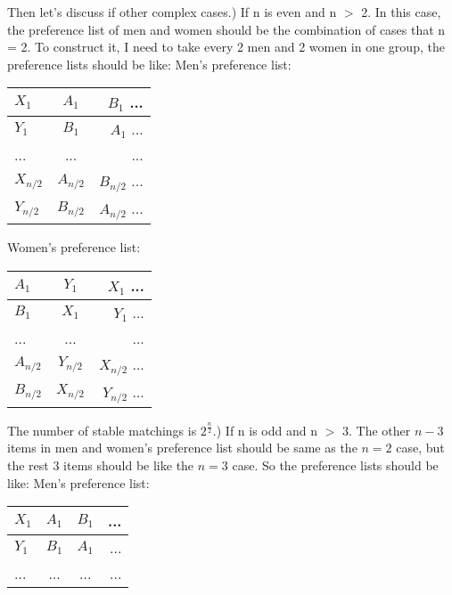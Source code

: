 \documentclass{article}       %
\begin{document}
\begin{enumerate}
\begin{enumerate}
               Then let's discuss if other complex cases.) If n is even and n $>$ 2. In this case, the preference list of men and women should be the combination of cases that n = 2. To construct it, I need to take every 2 men and 2 women in one group, the preference lists should be like:\newline
               Men's preference list:
               \begin{tabular}{ | l | c | r  }
               	\hline
               	$X_1$ & $A_1$ & $B_1$ ... \\ \hline
                $Y_1$ & $B_1$ & $A_1$ ... \\
               	... & ... & ... \\
               	$X_{n/2}$ & $A_{n/2}$ & $B_{n/2}$ ... \\ \hline
               	$Y_{n/2}$ & $B_{n/2}$ & $A_{n/2}$ ... \\ \hline
               \end{tabular}
               Women's preference list:
               \begin{tabular}{ | l | c | r  }
               	\hline
               	$A_1$ & $Y_1$ & $X_1$ ... \\ \hline
               	$B_1$ & $X_1$ & $Y_1$ ... \\
               	... & ... & ... \\
               	$A_{n/2}$ & $Y_{n/2}$ & $X_{n/2}$ ... \\ \hline
               	$B_{n/2}$ & $X_{n/2}$ & $Y_{n/2}$ ... \\ \hline
               \end{tabular}\newline
               The number of stable matchings is $2^{\frac{n}{2}}$.) If n is odd and n $>$ 3. The other $n-3$ items in men and women's preference list should be same as the $n = 2$ case, but the rest 3 items should be like the $n = 3$ case. So the preference lists should be like:\newline
               Men's preference list:
               \begin{tabular}{ | l | c | c | r  }
               	\hline
               	$X_1$ & $A_1$ & $B_1$ &... \\ \hline
               	$Y_1$ & $B_1$ & $A_1$ &... \\
               	... & ... & ...  & ...\\

\end{tabular}
\end{enumerate}
\end{enumerate}
\end{document}
